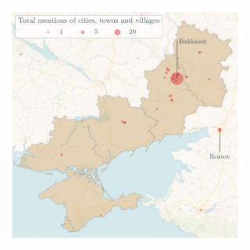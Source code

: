 \documentclass[11pt]{article}
\begin{document}
\begin{figure}[H]
    \centering
    \includegraphics[height=8cm]{../../outputs/main_report/figures/map.pdf}
\end{figure}
\end{document}

